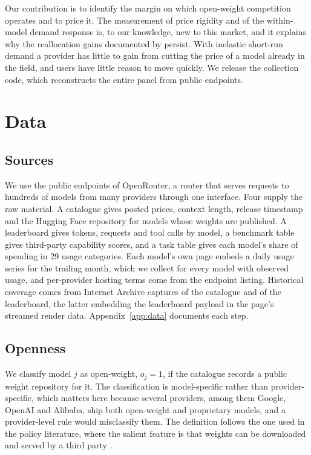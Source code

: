 \documentclass{article}
\newcommand{\Ntasks}{29}
\begin{document}
Our contribution is to identify the margin on which open-weight competition operates and
to price it. The measurement of price rigidity and of the within-model demand response
is, to our knowledge, new to this market, and it explains why the reallocation gains
documented by \citet{nagle2025} persist. With inelastic short-run demand a provider has
little to gain from cutting the price of a model already in the field, and users have little
reason to move quickly. We release the collection code, which reconstructs the
entire panel from public endpoints.

\section{Data}

\subsection{Sources}

We use the public endpoints of OpenRouter, a router that serves requests to hundreds of
models from many providers through one interface. Four supply the raw material. A catalogue gives
posted prices, context length, release timestamp and the Hugging Face repository for models
whose weights are published. A leaderboard gives tokens, requests and tool calls by model, a
benchmark table gives third-party capability scores, and a task table gives each model's
share of spending in \Ntasks{} usage categories. Each model's own page embeds a
daily usage series for the trailing month, which we collect for every model with observed
usage, and per-provider hosting terms come from the endpoint listing. Historical coverage
comes from Internet Archive captures of the catalogue and of the leaderboard, the latter
embedding the leaderboard payload in the page's streamed render data.
Appendix~\ref{app:data} documents each step.

\subsection{Openness}

We classify model $j$ as open-weight, $o_j = 1$, if the catalogue records a public weight
repository for it. The classification is model-specific rather than provider-specific,
which matters here because several providers, among them Google, OpenAI and Alibaba, ship
both open-weight and proprietary models, and a provider-level rule would misclassify them. The
definition follows the one used in the policy literature, where the salient feature is
that weights can be downloaded and served by a third party \citep{kapoor2024,ntia2024}.
\end{document}
